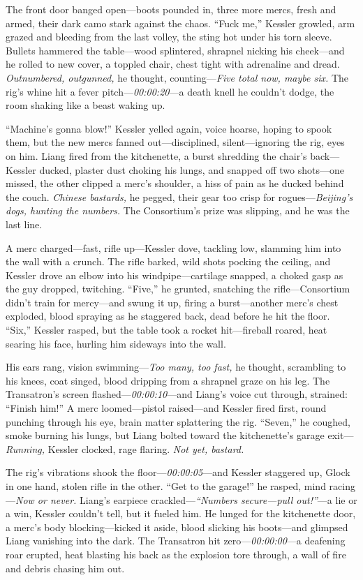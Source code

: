 \documentclass[12pt]{book}
\begin{document}
The front door banged open—boots pounded in, three more mercs, fresh and armed, their dark camo stark against the chaos. “Fuck me,” Kessler growled, arm grazed and bleeding from the last volley, the sting hot under his torn sleeve. Bullets hammered the table—wood splintered, shrapnel nicking his cheek—and he rolled to new cover, a toppled chair, chest tight with adrenaline and dread. \textit{Outnumbered, outgunned,} he thought, counting—\textit{Five total now, maybe six.} The rig’s whine hit a fever pitch—\textit{00:00:20}—a death knell he couldn’t dodge, the room shaking like a beast waking up.

“Machine’s gonna blow!” Kessler yelled again, voice hoarse, hoping to spook them, but the new mercs fanned out—disciplined, silent—ignoring the rig, eyes on him. Liang fired from the kitchenette, a burst shredding the chair’s back—Kessler ducked, plaster dust choking his lungs, and snapped off two shots—one missed, the other clipped a merc’s shoulder, a hiss of pain as he ducked behind the couch. \textit{Chinese bastards,} he pegged, their gear too crisp for rogues—\textit{Beijing’s dogs, hunting the numbers.} The Consortium’s prize was slipping, and he was the last line.

A merc charged—fast, rifle up—Kessler dove, tackling low, slamming him into the wall with a crunch. The rifle barked, wild shots pocking the ceiling, and Kessler drove an elbow into his windpipe—cartilage snapped, a choked gasp as the guy dropped, twitching. “Five,” he grunted, snatching the rifle—Consortium didn’t train for mercy—and swung it up, firing a burst—another merc’s chest exploded, blood spraying as he staggered back, dead before he hit the floor. “Six,” Kessler rasped, but the table took a rocket hit—fireball roared, heat searing his face, hurling him sideways into the wall.

His ears rang, vision swimming—\textit{Too many, too fast,} he thought, scrambling to his knees, coat singed, blood dripping from a shrapnel graze on his leg. The Transatron’s screen flashed—\textit{00:00:10}—and Liang’s voice cut through, strained: “Finish him!” A merc loomed—pistol raised—and Kessler fired first, round punching through his eye, brain matter splattering the rig. “Seven,” he coughed, smoke burning his lungs, but Liang bolted toward the kitchenette’s garage exit—\textit{Running,} Kessler clocked, rage flaring. \textit{Not yet, bastard.}

The rig’s vibrations shook the floor—\textit{00:00:05}—and Kessler staggered up, Glock in one hand, stolen rifle in the other. “Get to the garage!” he rasped, mind racing—\textit{Now or never.} Liang’s earpiece crackled—\textit{“Numbers secure—pull out!”}—a lie or a win, Kessler couldn’t tell, but it fueled him. He lunged for the kitchenette door, a merc’s body blocking—kicked it aside, blood slicking his boots—and glimpsed Liang vanishing into the dark. The Transatron hit zero—\textit{00:00:00}—a deafening roar erupted, heat blasting his back as the explosion tore through, a wall of fire and debris chasing him out.
\end{document}
